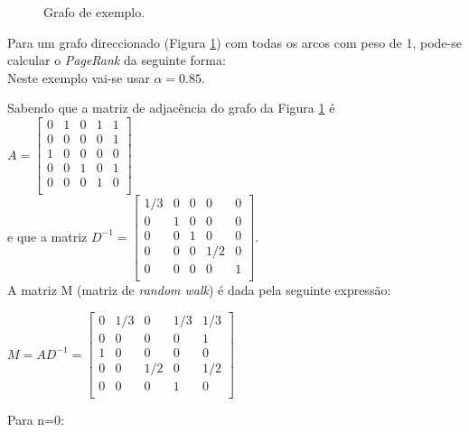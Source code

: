   \begin{figure}[h]
    \centering
    \caption{Grafo de exemplo.}
    \label{graph}
  \end{figure}

  Para um grafo direccionado (Figura \ref{graph}) com todas os arcos com peso de 1, pode-se calcular o \textit{PageRank} da seguinte forma:\\[0.25cm]
 
  Neste exemplo vai-se usar $\alpha=0.85$.
 
  Sabendo que a matriz de adjacência do grafo da Figura \ref{graph} é 
  $A=	\begin{bmatrix}
	  0 & 1 & 0 & 1 & 1 \\
	  0 & 0 & 0 & 0 & 1 \\
	  1 & 0 & 0 & 0 & 0 \\
	  0 & 0 & 1 & 0 & 1 \\
	  0 & 0 & 0 & 1 & 0 \\
	\end{bmatrix}$\\[0.25cm]
   e que a matriz $D^{{-}1}= \begin{bmatrix}
				1/3 & 0 & 0 & 0 & 0 \\
				0 & 1 & 0 & 0 & 0 \\
				0 & 0 & 1 & 0 & 0 \\
				0 & 0 & 0 & 1/2 & 0 \\
				0 & 0 & 0 & 0 & 1 \\
			      \end{bmatrix}$.
  \\[0.25cm]
  A matriz M (matriz de \textit{random walk}) é dada pela seguinte expressão:
  
  $M=AD^{{-}1}= \begin{bmatrix}
		0 & 1/3 & 0   & 1/3 & 1/3 \\
		0 & 0   & 0   & 0   & 1   \\
		1 & 0   & 0   & 0   & 0   \\
		0 & 0   & 1/2 & 0   & 1/2 \\
		0 & 0   & 0   & 1   & 0   \\
	      \end{bmatrix}$
  \\[0.25cm]
  \begin{bf}
    Para n=0:
  \end{bf}
  
